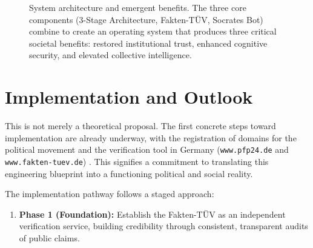 \documentclass[11pt,a4paper]{article}
\begin{document}
\begin{small}
\begin{figure}[h!]
\caption{System architecture and emergent benefits. The three core components (3-Stage Architecture, Fakten-TÜV, Socrates Bot) combine to create an operating system that produces three critical societal benefits: restored institutional trust, enhanced cognitive security, and elevated collective intelligence.}
\label{fig:system_architecture}
\end{figure}

\section{Implementation and Outlook}
This is not merely a theoretical proposal. The first concrete steps toward implementation are already underway, with the registration of domains for the political movement and the verification tool in Germany (\texttt{www.pfp24.de} and \texttt{www.fakten-tuev.de}) \citep{Kovnatsky2025PFP}. This signifies a commitment to translating this engineering blueprint into a functioning political and social reality.

The implementation pathway follows a staged approach:

\begin{enumerate}
    \item \textbf{Phase 1 (Foundation):} Establish the Fakten-TÜV as an independent verification service, building credibility through consistent, transparent audits of public claims.
    

\end{enumerate}
\end{small}
\end{document}
